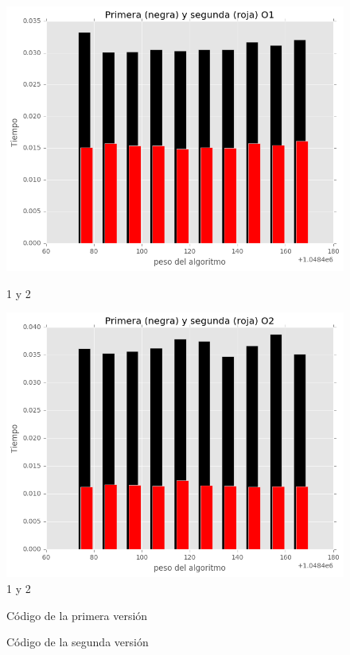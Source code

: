 \documentclass[a4paper, 11pt]{article}
\begin{document}
\begin{figure}[!hbp]
	\includegraphics[scale=0.6]{1y2p_1.png}
	\caption{1 y 2	\label{1y2p_1}}
	\includegraphics[scale=0.6]{1y2p_2.png}
	\caption{1 y 2	\label{1y2p_2}}
\end{figure}

\begin{figure}[!hbp]
	
	\caption{Código de la primera versión 	\label{pprimera versión}}
\end{figure}

\begin{figure}[!hbp]
	
	\caption{Código de la segunda versión 	\label{psegunda versión}}
\end{figure}
\end{document}
